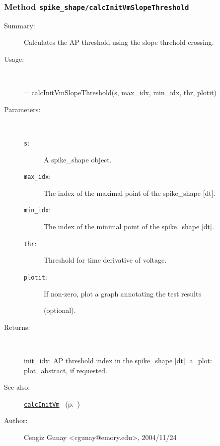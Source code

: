 \subsubsection[Method \texttt{calcInitVmSlopeThreshold}]{Method \texttt{spike\_shape/calcInitVmSlopeThreshold}}%
%
\label{ref_spike_shape__calcInitVmSlopeThreshold}%
\hypertarget{ref_spike_shape__calcInitVmSlopeThreshold}{}%
\begin{description}
\item[Summary:]Calculates the AP threshold using the slope threhold crossing.
%
\item[Usage:]~%
\begin{lyxcode}%
[init\_idx, a\_plot] = calcInitVmSlopeThreshold(s, max\_idx, min\_idx, thr, plotit)
%
\end{lyxcode}%
%
%
\item[Parameters:]~
\begin{description}%
\item[\texttt{s}:]
 A spike\_shape object.
\item[\texttt{max\_idx}:]
 The index of the maximal point of the spike\_shape [dt].
\item[\texttt{min\_idx}:]
 The index of the minimal point of the spike\_shape [dt].
\item[\texttt{thr}:]
 Threshold for time derivative of voltage.
\item[\texttt{plotit}:]
 If non-zero, plot a graph annotating the test results 

(optional).\end{description}%
%
\item[Returns:]~

	init\_idx: AP threshold index in the spike\_shape [dt].
	a\_plot: plot\_abstract, if requested.
%
%
\item[See also:]%
\hyperlink{ref_calcInitVm}{\texttt{calcInitVm}}%
\ (p.~\pageref{ref_calcInitVm})%
%
%
\item[Author:]%
Cengiz Gunay <cgunay@emory.edu>, 2004/11/24%
\end{description}
\methodline%

